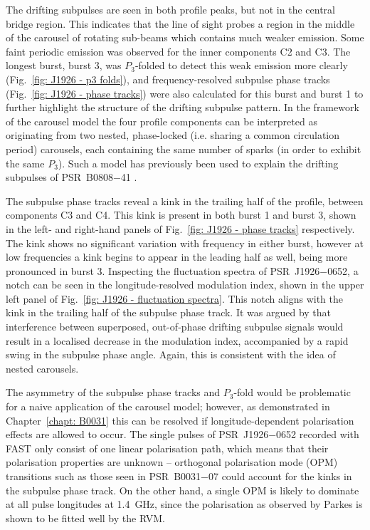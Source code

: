 The drifting subpulses are seen in both profile peaks, but not in the central bridge region. This indicates that the line of sight probes a region in the middle of the carousel of rotating sub-beams which contains much weaker emission. Some faint periodic emission was observed for the inner components C2 and C3. The longest burst, burst 3, was $P_3$-folded to detect this weak emission more clearly (Fig.~\ref{fig: J1926 - p3 folds}), and frequency-resolved subpulse phase tracks (Fig.~\ref{fig: J1926 - phase tracks}) were also calculated for this burst and burst 1 to further highlight the structure of the drifting subpulse pattern. In the framework of the carousel model the four profile components can be interpreted as originating from two nested, phase-locked (i.e. sharing a common circulation period) carousels, each containing the same number of sparks (in order to exhibit the same $P_3$). Such a model has previously been used to explain the drifting subpulses of PSR~B0808$-$41 \citep{BBGx2009}.  

The subpulse phase tracks reveal a kink in the trailing half of the profile, between components C3 and C4. This kink is present in both burst 1 and burst 3, shown in the left- and right-hand panels of Fig.~\ref{fig: J1926 - phase tracks} respectively. The kink shows no significant variation with frequency in either burst, however at low frequencies a kink begins to appear in the leading half as well, being more pronounced in burst 3. Inspecting the fluctuation spectra of PSR~J1926$-$0652, a notch can be seen in the longitude-resolved modulation index, shown in the upper left panel of Fig.~\ref{fig: J1926 - fluctuation spectra}. This notch aligns with the kink in the trailing half of the subpulse phase track. It was argued by \citet{ESLx2003} that interference between superposed, out-of-phase drifting subpulse signals would result in a localised decrease in the modulation index, accompanied by a rapid swing in the subpulse phase angle. Again, this is consistent with the idea of nested carousels.  

The asymmetry of the subpulse phase tracks and $P_3$-fold would be problematic for a naive application of the carousel model; however, as demonstrated in Chapter~\ref{chapt: B0031} this can be resolved if longitude-dependent polarisation effects are allowed to occur. The single pulses of PSR~J1926$-$0652 recorded with FAST only consist of one linear polarisation path, which means that their polarisation properties are unknown -- orthogonal polarisation mode (OPM) transitions such as those seen in PSR~B0031$-$07 could account for the kinks in the subpulse phase track. On the other hand, a single OPM is likely to dominate at all pulse longitudes at 1.4~GHz, since the polarisation as observed by Parkes is shown to be fitted well by the RVM.

